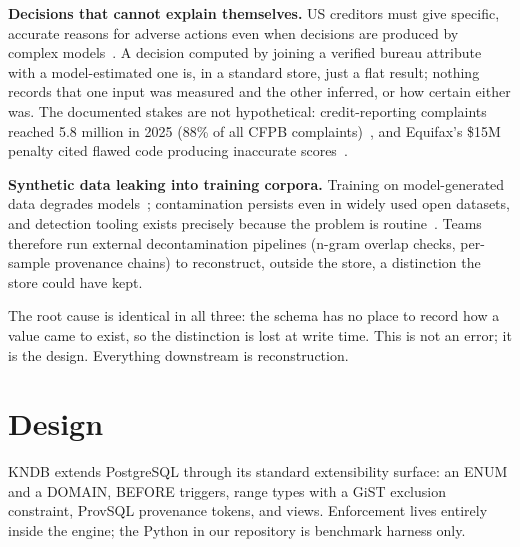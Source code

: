 \documentclass[sigconf,nonacm]{acmart}
\begin{document}
\noindent\textbf{Decisions that cannot explain themselves.} US creditors must give specific, accurate reasons for adverse actions even when decisions are produced by complex models~\cite{cfpb2023}. A decision computed by joining a verified bureau attribute with a model-estimated one is, in a standard store, just a flat result; nothing records that one input was measured and the other inferred, or how certain either was. The documented stakes are not hypothetical: credit-reporting complaints reached 5.8 million in 2025 (88\% of all CFPB complaints)~\cite{cfpb2025}, and Equifax's \$15M penalty cited flawed code producing inaccurate scores~\cite{equifax}.

\noindent\textbf{Synthetic data leaking into training corpora.} Training on model-generated data degrades models~\cite{collapse}; contamination persists even in widely used open datasets, and detection tooling exists precisely because the problem is routine~\cite{codec}. Teams therefore run external decontamination pipelines (n-gram overlap checks, per-sample provenance chains) to reconstruct, outside the store, a distinction the store could have kept.

The root cause is identical in all three: the schema has no place to record how a value came to exist, so the distinction is lost at write time. This is not an error; it is the design. Everything downstream is reconstruction.

\section{Design}
KNDB extends PostgreSQL through its standard extensibility surface: an ENUM and a DOMAIN, BEFORE triggers, range types with a GiST exclusion constraint, ProvSQL provenance tokens, and views. Enforcement lives entirely inside the engine; the Python in our repository is benchmark harness only.
\end{document}
